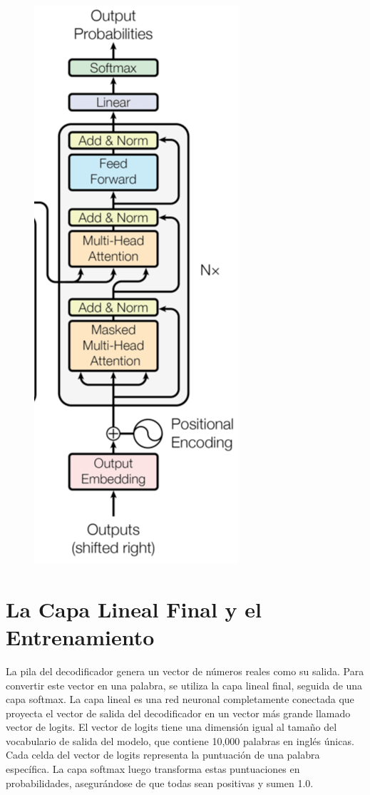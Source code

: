 \begin{figure}[h]
  \centering
  \includegraphics[scale=0.29]{pics/transformerdecoder.png}
\end{figure}

\section{La Capa Lineal Final y el Entrenamiento}
La pila del decodificador genera un vector de números reales como su salida. Para convertir este vector en una palabra, se utiliza la capa lineal final, seguida de una capa softmax. La capa lineal es una red neuronal completamente conectada que proyecta el vector de salida del decodificador en un vector más grande llamado vector de logits. El vector de logits tiene una dimensión igual al tamaño del vocabulario de salida del modelo, que contiene 10,000 palabras en inglés únicas. Cada celda del vector de logits representa la puntuación de una palabra específica.  La capa softmax luego transforma estas puntuaciones en probabilidades, asegurándose de que todas sean positivas y sumen 1.0.

